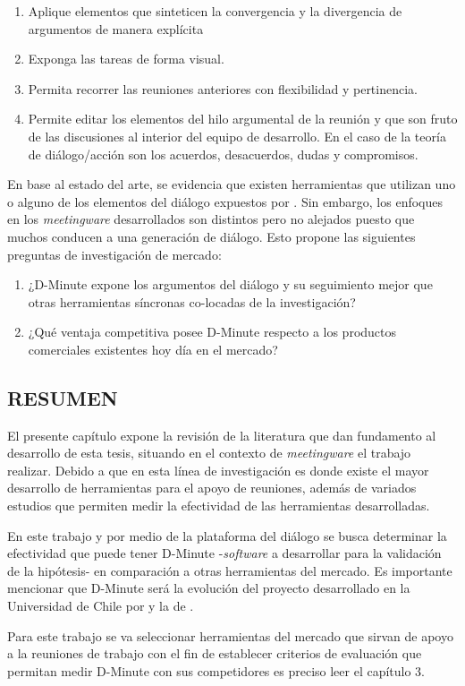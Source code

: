 \begin{enumerate}[1.]
    \item Aplique elementos que sinteticen la convergencia y la divergencia de argumentos de manera explícita
    \item Exponga las tareas de forma visual.
    \item Permita recorrer las reuniones anteriores con flexibilidad y pertinencia.
    \item Permite editar los elementos del hilo argumental de la reunión y que son fruto de las discusiones al interior del equipo de desarrollo. En el caso de la teoría de diálogo/acción son los acuerdos, desacuerdos, dudas y compromisos.
\end{enumerate}

En base al estado del arte, se evidencia que existen herramientas que utilizan uno o alguno de los elementos del diálogo expuestos por . Sin embargo, los enfoques en los \textit{meetingware} desarrollados son distintos pero no alejados puesto que muchos conducen a una generación de diálogo. Esto propone las siguientes preguntas de investigación de mercado:

\begin{enumerate}[1.]
    \item ¿D-Minute expone los argumentos del diálogo y su seguimiento mejor que otras herramientas síncronas co-locadas de la investigación?
    \item ¿Qué ventaja competitiva posee D-Minute respecto a los productos comerciales existentes hoy día en el mercado?
\end{enumerate}

\subsection{RESUMEN}

El presente capítulo expone la revisión de la literatura que dan fundamento al desarrollo de esta tesis, situando en el contexto de \textit{meetingware} el trabajo realizar. Debido a que en esta línea de investigación es donde existe el mayor desarrollo de herramientas para el apoyo de reuniones, además de variados estudios que permiten medir la efectividad de las herramientas desarrolladas. 

En este trabajo y por medio de la plataforma del diálogo se busca determinar la efectividad que puede tener D-Minute -\textit{software} a desarrollar para la validación de la hipótesis- en comparación a otras herramientas del mercado. Es importante mencionar que D-Minute será la evolución del proyecto desarrollado en la Universidad de Chile por  y la de .

Para este trabajo se va seleccionar herramientas del mercado que sirvan de apoyo a la reuniones de trabajo con el fin de establecer criterios de evaluación que permitan medir D-Minute con sus competidores es preciso leer el capítulo 3.
